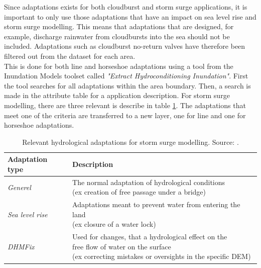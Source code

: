 Since adaptations exists for both cloudburst and storm surge applications, it is important to only use those adaptations that have an impact on sea level rise and storm surge modelling. This means that adaptations that are designed, for example, discharge rainwater from cloudbursts into the sea should not be included. Adaptations such as cloudburst no-return valves have therefore been filtered out from the dataset for each area.\\
This is done for both line and horseshoe adaptations using a tool from the Inundation Models toolset called \textit{"Extract Hydroconditioning Inundation"}. First the tool searches for all adaptations within the area boundary. Then, a search is made in the attribute table for a application description. For storm surge modelling, there are three relevant is describe in table \ref{Tabel: Relevante hydrologiske tilpasninger}. The adaptations that meet one of the criteria are transferred to a new layer, one for line and one for horseshoe adaptations. 
\begin{table}[H]
	\centering
	\renewcommand{\arraystretch}{1.5}
	\begin{threeparttable}
		\caption{Relevant hydrological adaptations for storm surge modelling. Source: \cite{GeoDanmark_HydroLag}.}
		\label{Tabel: Relevante hydrologiske tilpasninger}
		\begin{tabular}{@{} l l @{}} 
			\toprule
			\textbf{Adaptation type} & \textbf{Description} \\
			\midrule
			\textit{Generel} &
			\makecell[l]{The normal adaptation of hydrological conditions\\
				(ex creation of free passage under a bridge)} \\
			\addlinespace
			\textit{Sea level rise} &
			\makecell[l]{Adaptations meant to prevent water from entering the land\\
				(ex closure of a water lock)} \\
			\addlinespace
			\textit{DHMFix} &
			\makecell[l]{Used for changes, that a hydrological effect on the\\ free flow of water on the surface\\
				(ex correcting mistakes or oversights in the specific DEM)} \\
			\bottomrule
		\end{tabular}
	\end{threeparttable}
\end{table}

